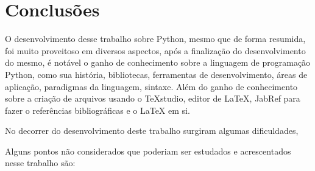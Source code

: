 

\chapter{Conclusões}

O desenvolvimento desse trabalho sobre Python, mesmo que de forma resumida, foi muito proveitoso em diversos aspectos, após a finalização do desenvolvimento do mesmo, é notável o ganho de conhecimento sobre a linguagem de programação Python, como sua história, bibliotecas, ferramentas de desenvolvimento, áreas de aplicação, paradigmas da linguagem, sintaxe. Além do ganho de conhecimento sobre a criação de arquivos usando o TeXstudio, editor de LaTeX, JabRef para fazer o referências bibliográficas e o LaTeX em si.

No decorrer do desenvolvimento deste trabalho surgiram algumas dificuldades,


Alguns pontos não considerados que poderiam ser estudados e acrescentados nesse trabalho são:

